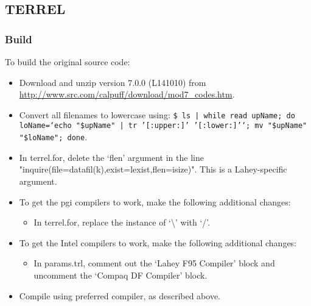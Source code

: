 \documentclass[10pt,a4paper]{article}
\begin{document}
\subsection{TERREL}
\subsubsection{Build}
To build the original source code:
\begin{itemize}
\item Download and unzip version 7.0.0 (L141010) from \url{http://www.src.com/calpuff/download/mod7_codes.htm}.
\item Convert all filenames to lowercase using: \texttt{\$ ls | while read upName; do loName=`echo "\${upName}" | tr '[:upper:]' '[:lower:]'`; mv "\$upName" "\$loName"; done}.
\item In terrel.for, delete the `flen' argument in the line "inquire(file=datafil(k),exist=lexist,flen=isize)". This is a Lahey-specific argument.
\item To get the pgi compilers to work, make the following additional changes:
\begin{itemize}
\item In terrel.for, replace the instance of `\textbackslash' with `/'.
\end{itemize}
\item To get the Intel compilers to work, make the following additional changes:
\begin{itemize}
\item In params.trl, comment out the `Lahey F95 Compiler' block and uncomment the `Compaq DF Compiler' block.
\end{itemize}
\item Compile using preferred compiler, as described above.
\end{itemize}
\end{document}
